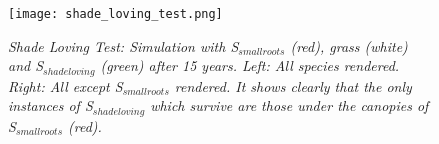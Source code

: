 \begin{figure}
\center
	\texttt{[image: shade\_loving\_test.png]}
	\caption{ \textit{Shade Loving Test: Simulation with \textit{S$_{smallroots}$} (red), grass (white) and \textit{S$_{shadeloving}$} (green) after 15 years. Left: All species rendered. Right: All except \textit{S$_{smallroots}$} rendered. It shows clearly that the only instances of \textit{S$_{shadeloving}$} which survive are those under the canopies of \textit{S$_{smallroots}$} (red).}}
	\label{fig:shade_loving_test}
\end{figure}
